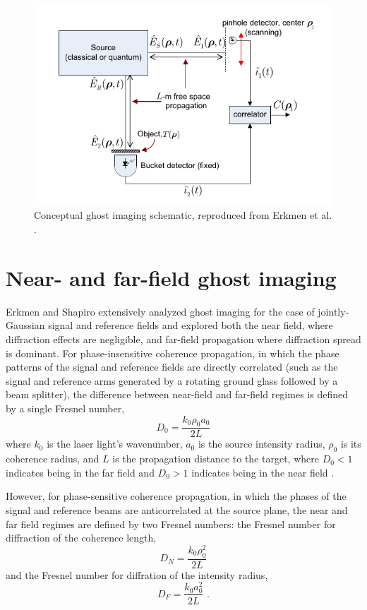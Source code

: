\begin{figure}[htb]
\centerline{\includegraphics[width=12cm]{figure-ghost-schematic.pdf}}
\caption{Conceptual ghost imaging schematic, reproduced from Erkmen et al. \cite{erkmen-unified}.}
\label{figure:ghost-schematic}
\end{figure}

\section{Near- and far-field ghost imaging}

Erkmen and Shapiro extensively analyzed ghost imaging for the case of jointly-Gaussian signal and reference fields and explored both the near field, where diffraction effects are negligible, and far-field propagation where diffraction spread is dominant. For phase-insensitive coherence propagation, in which the phase patterns of the signal and reference fields are directly correlated (such as the signal and reference arms generated by a rotating ground glass followed by a beam splitter), the difference between near-field and far-field regimes is defined by a single Fresnel number,
\begin{equation}
D_0 = \frac{k_0 \rho_0 a_0}{2L}
\end{equation}
where $k_0$ is the laser light's wavenumber, $a_0$ is the source intensity radius, $\rho_0$ is its coherence radius, and $L$ is the propagation distance to the target, where $D_0 < 1$ indicates being in the far field and $D_0 > 1$ indicates being in the near field \cite{erkmen-unified}.

However, for phase-sensitive coherence propagation, in which the phases of the signal and reference beams are anticorrelated at the source plane, the near and far field regimes are defined by two Fresnel numbers: the Fresnel number for diffraction of the coherence length,
\begin{equation}
D_N = \frac{k_0\rho_0^2}{2L}
\end{equation}
and the Fresnel number for diffration of the intensity radius,
\begin{equation}
D_F = \frac{k_0 a_0^2}{2L}\,\,.
\end{equation}

